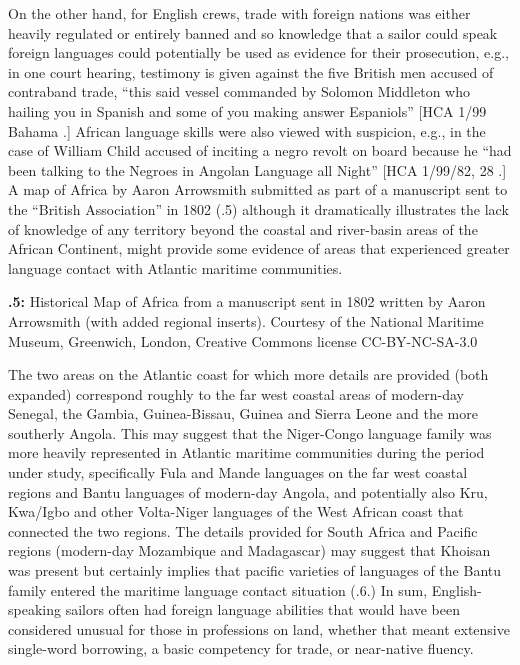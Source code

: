   On the other hand, for English crews, trade with foreign nations was either heavily regulated or entirely banned and so knowledge that a sailor could speak foreign languages could potentially be used as evidence for their prosecution, e.g., in one court hearing, testimony is given against the five British men accused of contraband trade, “this said vessel commanded by Solomon Middleton who hailing you in Spanish and some of you making answer Espaniols” [HCA 1/99 Bahama \citealt{Islands1722}.] African language skills were also viewed with suspicion, e.g., in the case of William Child accused of inciting a negro revolt on board because he “had been talking to the Negroes in Angolan Language all Night” [HCA 1/99/82, 28 \citealt{March1722}.] A map of Africa by Aaron Arrowsmith submitted as part of a manuscript sent to the “British Association” in 1802 (.5) although it dramatically illustrates the lack of knowledge of any territory beyond the coastal and river-basin areas of the African Continent, might provide some evidence of areas that experienced greater language contact with Atlantic maritime communities. 

 

{\textbf{.5:}}{ Historical} Map of Africa from a manuscript sent in 1802 written by Aaron Arrowsmith (with added regional inserts). Courtesy of the National Maritime Museum, Greenwich, London, Creative Commons license CC-BY-NC-SA-3.0

The two areas on the Atlantic coast for which more details are provided (both expanded) correspond roughly to the far west coastal areas of modern-day Senegal, the Gambia, Guinea-Bissau, Guinea and Sierra Leone and the more southerly Angola. This may suggest that the Niger-Congo language family was more heavily represented in Atlantic maritime communities during the period under study, specifically Fula and Mande languages on the far west coastal regions and Bantu languages of modern-day Angola, and potentially also Kru, Kwa/Igbo and other Volta-Niger languages of the West African coast that connected the two regions. The details provided for South Africa and Pacific regions (modern-day Mozambique and Madagascar) may suggest that Khoisan was present but certainly implies that pacific varieties of languages of the Bantu family entered the maritime language contact situation (.6.) In sum, English-speaking sailors often had foreign language abilities that would have been considered unusual for those in professions on land, whether that meant extensive single-word borrowing, a basic competency for trade, or near-native fluency. 

